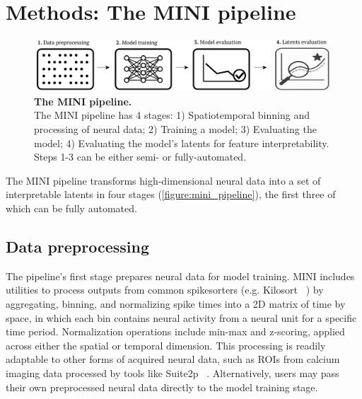 \section{Methods: The MINI pipeline}

\begin{figure}[h]
    \centering
    \includegraphics[width=\linewidth]{figures/mini_pipeline.pdf}
    \caption{
        \textbf{The MINI pipeline.} \\
        \small The MINI pipeline has 4 stages: 1) Spatiotemporal binning and processing of neural data; 2) Training a model; 3) Evaluating the model; 4) Evaluating the model's latents for feature interpretability. Steps 1-3 can be either semi- or fully-automated.
    }
    \label{figure:mini_pipeline}
\end{figure}

The MINI pipeline transforms high-dimensional neural data into a set of interpretable latents in four stages (\autoref{figure:mini_pipeline}), the first three of which can be fully automated.

\subsection{Data preprocessing}

The pipeline's first stage prepares neural data for model training. MINI includes utilities to process outputs from common spikesorters (e.g. Kilosort ~\cite{pachitariu_2016_kilosort}) by aggregating, binning, and normalizing spike times into a 2D matrix of time by space, in which each bin contains neural activity from a neural unit for a specific time period. Normalization operations include min-max and z-scoring, applied across either the spatial or temporal dimension. This processing is readily adaptable to other forms of acquired neural data, such as ROIs from calcium imaging data processed by tools like Suite2p ~\cite{pachitariu_2017_suite2p}. Alternatively, users may pass their own preprocessed neural data directly to the model training stage.

